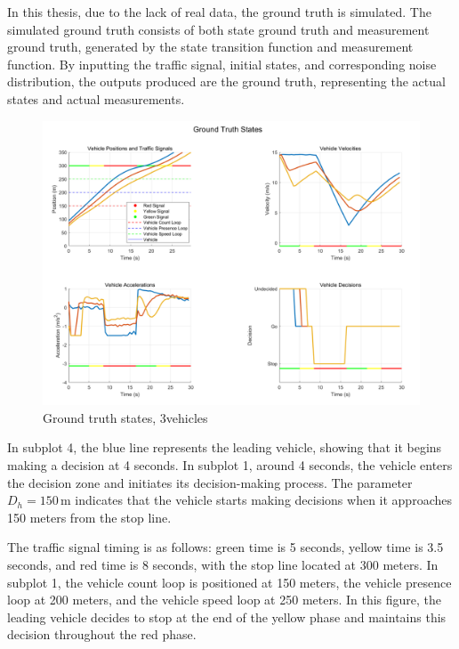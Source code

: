 In this thesis, due to the lack of real data, the ground truth is simulated. The simulated ground truth consists of both state ground truth and measurement ground truth, generated by the state transition function and measurement function. By inputting the traffic signal, initial states, and corresponding noise distribution, the outputs produced are the ground truth, representing the actual states and actual measurements.

\begin{figure}[H]
    \centering
    \includegraphics[width= 1\linewidth]{figures/groundtruth-3vehicles.png}
    \caption{Ground truth states, 3vehicles}
    \label{fig: groundtruth-3vehicles}
\end{figure}

In subplot 4, the blue line represents the leading vehicle, showing that it begins making a decision at 4 seconds. In subplot 1, around 4 seconds, the vehicle enters the decision zone and initiates its decision-making process. The parameter $D_h = 150\,\text{m}$ indicates that the vehicle starts making decisions when it approaches 150 meters from the stop line.

The traffic signal timing is as follows: green time is 5 seconds, yellow time is 3.5 seconds, and red time is 8 seconds, with the stop line located at 300 meters. In subplot 1, the vehicle count loop is positioned at 150 meters, the vehicle presence loop at 200 meters, and the vehicle speed loop at 250 meters. In this figure, the leading vehicle decides to stop at the end of the yellow phase and maintains this decision throughout the red phase.


